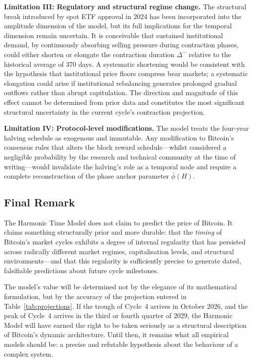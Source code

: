 \textbf{Limitation III: Regulatory and structural regime change.} The
structural break introduced by spot ETF approval in 2024 has been incorporated
into the amplitude dimension of the model, but its full implications for the
temporal dimension remain uncertain. It is conceivable that sustained
institutional demand, by continuously absorbing selling pressure during
contraction phases, could either shorten or elongate the contraction duration
$\Delta^{-}$ relative to the historical average of 370 days. A systematic
shortening would be consistent with the hypothesis that institutional price
floors compress bear markets; a systematic elongation could arise if
institutional rebalancing generates prolonged gradual outflows rather than
abrupt capitulation. The direction and magnitude of this effect cannot be
determined from prior data and constitutes the most significant structural
uncertainty in the current cycle's contraction projection.

\textbf{Limitation IV: Protocol-level modifications.} The model treats the
four-year halving schedule as exogenous and immutable. Any modification to
Bitcoin's consensus rules that alters the block reward schedule---whilst
considered a negligible probability by the research and technical community at
the time of writing---would invalidate the halving's role as a temporal
node and require a complete reconstruction of the phase anchor parameter
$\bar{\phi}(H)$.

\subsection{Final Remark}

The Harmonic Time Model does not claim to predict the price of Bitcoin. It
claims something structurally prior and more durable: that the \textit{timing}
of Bitcoin's market cycles exhibits a degree of internal regularity that has
persisted across radically different market regimes, capitalisation levels, and
structural environments---and that this regularity is sufficiently precise to
generate dated, falsifiable predictions about future cycle milestones.

The model's value will be determined not by the elegance of its mathematical
formulation, but by the accuracy of the projection entered in
Table~\ref{tab:projections}. If the trough of Cycle~4 arrives in October 2026,
and the peak of Cycle~4 arrives in the third or fourth quarter of 2029, the
Harmonic Model will have earned the right to be taken seriously as a
structural description of Bitcoin's dynamic architecture. Until then, it
remains what all empirical models should be: a precise and refutable
hypothesis about the behaviour of a complex system.

